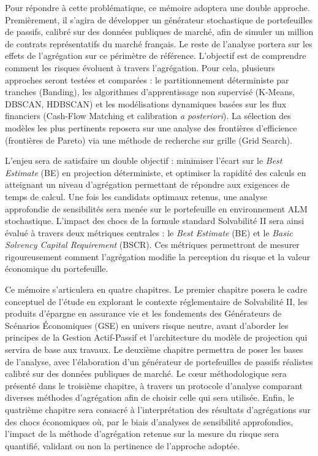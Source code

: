 Pour répondre à cette problématique, ce mémoire adoptera une double approche. Premièrement, il s'agira de développer un générateur stochastique de portefeuilles de passifs, calibré sur des données publiques de marché, afin de simuler un million de contrats représentatifs du marché français. Le reste de l'analyse portera sur les effets de l'agrégation sur ce périmètre de référence. L'objectif est de comprendre comment les risques évoluent à travers l'agrégation. Pour cela, plusieurs approches seront testées et comparées : le partitionnement déterministe par tranches (Banding), les algorithmes d'apprentissage non supervisé (K-Means, DBSCAN, HDBSCAN) et les modélisations dynamiques basées sur les flux financiers (Cash-Flow Matching et calibration \textit{a posteriori}). La sélection des modèles les plus pertinents reposera sur une analyse des frontières d'efficience (frontières de Pareto) via une méthode de recherche sur grille (Grid Search). 

L'enjeu sera de satisfaire un double objectif : minimiser l'écart sur le \textit{Best Estimate} (BE) en projection déterministe, et optimiser la rapidité des calculs en atteignant un niveau d'agrégation permettant de répondre aux exigences de temps de calcul. Une fois les candidats optimaux retenus, une analyse approfondie de sensibilités sera menée sur le portefeuille en environnement ALM stochastique. L'impact des chocs de la formule standard Solvabilité II sera ainsi évalué à travers deux métriques centrales : le \textit{Best Estimate} (BE) et le \textit{Basic Solvency Capital Requirement} (BSCR). Ces métriques permettront de mesurer rigoureusement comment l'agrégation modifie la perception du risque et la valeur économique du portefeuille.

Ce mémoire s'articulera en quatre chapitres. Le premier chapitre posera le cadre conceptuel de l'étude en explorant le contexte réglementaire de Solvabilité II, les produits d'épargne en assurance vie et les fondements des Générateurs de Scénarios Économiques (GSE) en univers risque neutre, avant d'aborder les principes de la Gestion Actif-Passif et l'architecture du modèle de projection qui servira de base aux travaux. Le deuxième chapitre permettra de poser les bases de l'analyse, avec l'élaboration d'un générateur de portefeuilles de passifs réalistes calibré sur des données publiques de marché. Le cœur méthodologique sera présenté dans le troisième chapitre, à travers un protocole d'analyse comparant diverses méthodes d'agrégation afin de choisir celle qui sera utilisée. Enfin, le quatrième chapitre sera consacré à l'interprétation des résultats d'agrégations sur des chocs économiques où, par le biais d'analyses de sensibilité approfondies, l'impact de la méthode d'agrégation retenue sur la mesure du risque sera quantifié, validant ou non la pertinence de l'approche adoptée.